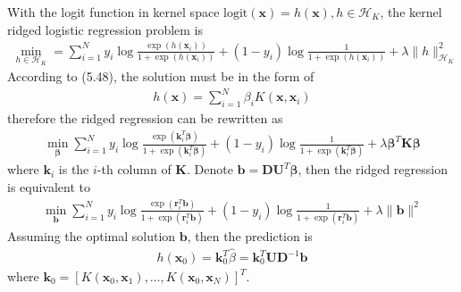 \begin{exercise}
  With the logit function in kernel space
  $\mbox{logit}(\mathbf{x}) = h(\mathbf{x}), h\in\mathcal{H}_K$, the kernel
  ridged logistic regression problem is
  \begin{align}
    \min_{h\in\mathcal{H}_K} = \sum_{i=1}^N y_i\log\frac{\exp(h(\mathbf{x}_i))}
    {1 + \exp(h(\mathbf{x}_i))} + (1 - y_i)\log\frac{1}{1 +
    \exp(h(\mathbf{x}_i))} + \lambda\|h\|_{\mathcal{H}_K}^2
  \end{align}
  According to (5.48), the solution must be in the form of
  \begin{align}
    h(\mathbf{x}) = \sum_{i=1}^N\beta_iK(\mathbf{x}, \mathbf{x}_i)
  \end{align}
  therefore the ridged regression can be rewritten as
  \begin{align}
    \min_{\bm{\beta}} \sum_{i=1}^N y_i\log\frac{\exp(\mathbf{k}_i^T\bm{\beta})}
    {1 + \exp(\mathbf{k}_i^T\bm{\beta})} + (1 - y_i)\log\frac{1}{1 +
    \exp(\mathbf{k}_i^T\bm{\beta})} + \lambda\bm{\beta}^T\mathbf{K}\bm{\beta}
  \end{align}
  where $\mathbf{k}_i$ is the $i$-th column of $\mathbf{K}$. Denote $\mathbf{b}
  = \mathbf{DU}^T\bm{\beta}$, then the ridged regression is equivalent to
  \begin{align}
    \min_{\mathbf{b}} \sum_{i=1}^N y_i\log\frac{\exp(\mathbf{r}_i^T\mathbf{b})}
    {1 + \exp(\mathbf{r}_i^T\mathbf{b})} + (1 - y_i)\log\frac{1}{1 +
    \exp(\mathbf{r}_i^T\mathbf{b})} + \lambda\|\mathbf{b}\|^2
  \end{align}
  Assuming the optimal solution $\mathbf{b}$, then the prediction is
  \begin{align}
    h(\mathbf{x}_0) = \mathbf{k}_0^T\hat{\beta} = \mathbf{k}_0^T
    \mathbf{UD}^{-1}\mathbf{b}
  \end{align}
  where $\mathbf{k}_0 = [K(\mathbf{x}_0, \mathbf{x}_1),\ldots, K(\mathbf{x}_0,
  \mathbf{x}_N)]^T$.
\end{exercise}

